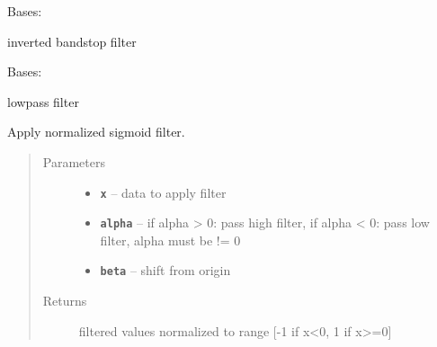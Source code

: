 \documentclass[letterpaper,10pt,english]{sphinxmanual}
\begin{document}

\begin{fulllineitems}
\label{RRtoolbox.lib.arrayops:RRtoolbox.lib.arrayops.filters.invertedbandstop}
Bases: {\hyperref[RRtoolbox.lib.arrayops:RRtoolbox.lib.arrayops.filters.bandstop]{\emph{}}}

inverted bandstop filter

\end{fulllineitems}


\begin{fulllineitems}
\label{RRtoolbox.lib.arrayops:RRtoolbox.lib.arrayops.filters.lowpass}
Bases: {\hyperref[RRtoolbox.lib.arrayops:RRtoolbox.lib.arrayops.filters.FilterBase]{\emph{}}}

lowpass filter

\end{fulllineitems}


\begin{fulllineitems}
\label{RRtoolbox.lib.arrayops:RRtoolbox.lib.arrayops.filters.normsigmoid}
Apply normalized sigmoid filter.
\begin{quote}\begin{description}
\item[{Parameters}] \leavevmode\begin{itemize}
\item {} 
\textbf{\texttt{x}} -- data to apply filter

\item {} 
\textbf{\texttt{alpha}} -- if alpha \textgreater{} 0: pass high filter, if alpha \textless{} 0: pass low filter, alpha must be != 0

\item {} 
\textbf{\texttt{beta}} -- shift from origin

\end{itemize}

\item[{Returns}] \leavevmode
filtered values normalized to range {[}-1 if x\textless{}0, 1 if x\textgreater{}=0{]}

\end{description}\end{quote}

\end{fulllineitems}
\end{document}
